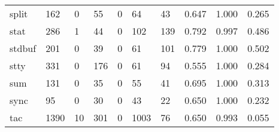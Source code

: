 \begin{longtable}{lp{1.3cm}p{1.3cm}p{1.3cm}p{1.3cm}p{1.3cm}p{1.3cm}p{1.3cm}p{1.3cm}p{1.3cm}}
split     &                    162 &                                  0 &                                55 &                                0 &                                64 &                              43 &                                0.647 &                                  1.000 &                                0.265 \\
stat      &                    286 &                                  1 &                                44 &                                0 &                               102 &                             139 &                                0.792 &                                  0.997 &                                0.486 \\
stdbuf    &                    201 &                                  0 &                                39 &                                0 &                                61 &                             101 &                                0.779 &                                  1.000 &                                0.502 \\
stty      &                    331 &                                  0 &                               176 &                                0 &                                61 &                              94 &                                0.555 &                                  1.000 &                                0.284 \\
sum       &                    131 &                                  0 &                                35 &                                0 &                                55 &                              41 &                                0.695 &                                  1.000 &                                0.313 \\
sync      &                     95 &                                  0 &                                30 &                                0 &                                43 &                              22 &                                0.650 &                                  1.000 &                                0.232 \\
tac       &                   1390 &                                 10 &                               301 &                                0 &                              1003 &                              76 &                                0.650 &                                  0.993 &                                0.055 \\

\end{longtable}
